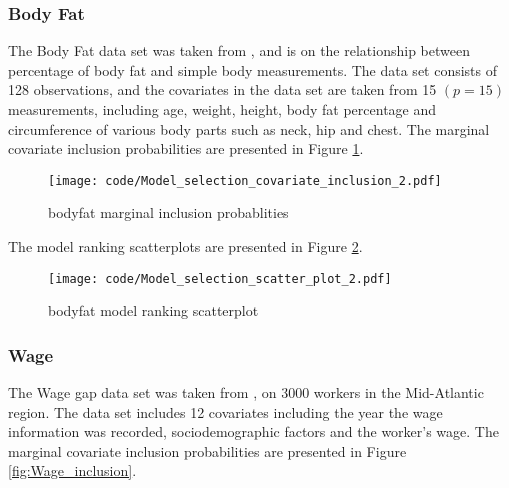 \documentclass{amsart}[12pt]
\begin{document}
\subsubsection{Body Fat}

The Body Fat data set was taken from \cite{Tarr2015}, and is on the relationship between percentage of body
fat and simple body measurements. The data set consists of 128 observations, and the covariates in the data
set are taken from 15 $(p=15)$ measurements, including age, weight, height, body fat percentage and
circumference of various body parts such as neck, hip and chest. The marginal covariate inclusion
probabilities are presented in Figure \ref{fig:bodyfat_inclusion}.


\begin{figure}[p]
	\texttt{[image: code/Model\_selection\_covariate\_inclusion\_2.pdf]}
	\caption{bodyfat marginal inclusion probablities}
	\label{fig:bodyfat_inclusion}
\end{figure}

The model ranking scatterplots are presented in Figure \ref{fig:bodyfat_model_ranking}.

\begin{figure}[p]
	\texttt{[image: code/Model\_selection\_scatter\_plot\_2.pdf]}
	\caption{bodyfat model ranking scatterplot}
	\label{fig:bodyfat_model_ranking}
\end{figure}

\subsubsection{Wage}

The Wage gap data set was taken from \cite{James:2014:ISL:2517747}, on 3000 workers in the Mid-Atlantic
region. The data set includes 12 covariates including the year the wage information was recorded,
sociodemographic factors and the worker's wage. The marginal covariate inclusion probabilities are presented
in Figure \ref{fig:Wage_inclusion}.
\end{document}
